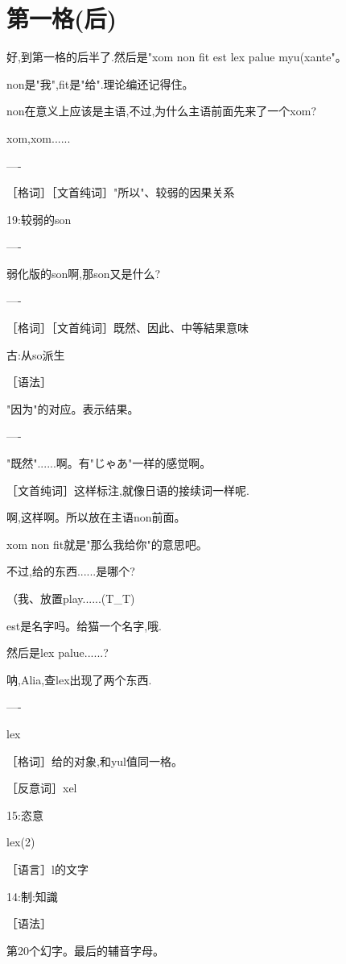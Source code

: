 \chapter{第一格(后)}


好,到第一格的后半了.然后是"xom non fit est lex palue myu(xante"。

non是"我",fit是"给".理论编还记得住。

non在意义上应该是主语,不过,为什么主语前面先来了一个xom?

xom,xom......

----

［格词］［文首纯词］"所以"、较弱的因果关系

19:较弱的son

----


弱化版的son啊,那son又是什么?

----

［格词］［文首纯词］既然、因此、中等結果意味

古:从so派生

［语法］

"因为"的对应。表示结果。


----


"既然"......啊。有"じゃあ"一样的感觉啊。

［文首纯词］这样标注,就像日语的接续词一样呢.

啊,这样啊。所以放在主语non前面。

xom non fit就是"那么我给你"的意思吧。

不过,给的东西......是哪个?



（我、放置play......(T\_{}T)


est是名字吗。给猫一个名字,哦.

然后是lex palue......?

呐,Alia,查lex出现了两个东西.

----

lex

［格词］给的对象,和yul值同一格。

［反意词］xel

15:恣意

lex(2)

［语言］l的文字

14:制:知識

［语法］

第20个幻字。最后的辅音字母。



